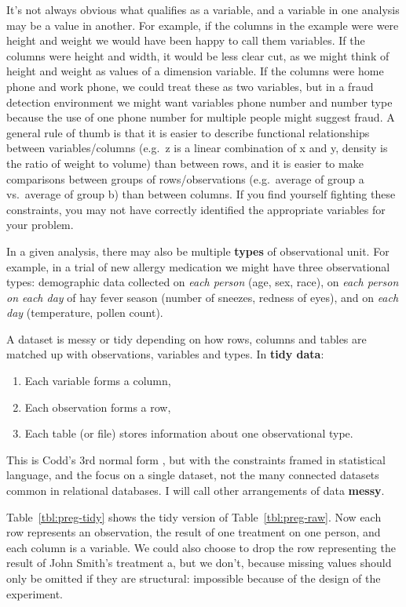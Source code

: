 \documentclass[article]{jss}
\begin{document}
It's not always obvious what qualifies as a variable, and a variable in one analysis may be a value in another. For example, if the columns in the example were were height and weight we would have been happy to call them variables. If the columns were height and width, it would be less clear cut, as we might think of height and weight as values of a dimension variable. If the columns were home phone and work phone, we could treat these as two variables, but in a fraud detection environment we might want variables phone number and number type because the use of one phone number for multiple people might suggest fraud. A general rule of thumb is that it is easier to describe functional relationships between variables/columns (e.g.\ z is a linear combination of x and y, density is the ratio of weight to volume) than between rows, and it is easier to make comparisons between groups of rows/observations (e.g.\ average of group a vs.\ average of group b) than between columns. If you find yourself fighting these constraints, you may not have correctly identified the appropriate variables for your problem.

In a given analysis, there may also be multiple \textbf{types} of observational unit. For example, in a trial of new allergy medication we might have three observational types: demographic data collected on \emph{each person} (age, sex, race), on \emph{each person on each day} of hay fever season (number of sneezes, redness of eyes), and on \emph{each day} (temperature, pollen count).

A dataset is messy or tidy depending on how rows, columns and tables are matched up with observations, variables and types. In {\bf tidy data}:

\begin{enumerate}
  \item Each variable forms a column,
  \item Each observation forms a row,
  \item Each table (or file) stores information about one observational type.
\end{enumerate}

\noindent This is Codd's 3rd normal form \citep{codd:1990}, but with the constraints framed in statistical language, and the focus on a single dataset, not the many connected datasets common in relational databases. I will call other arrangements of data {\bf messy}. 

Table~\ref{tbl:preg-tidy} shows the tidy version of Table~\ref{tbl:preg-raw}. Now each row represents an observation, the result of one treatment on one person, and each column is a variable. We could also choose to drop the row representing the result of John Smith's treatment a, but we don't, because missing values should only be omitted if they are structural: impossible because of the design of the experiment.
\end{document}
